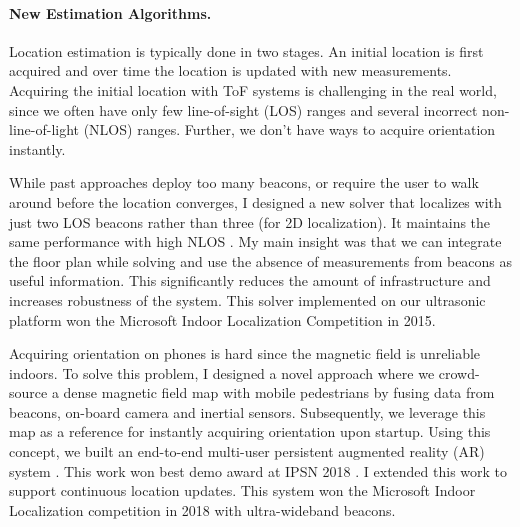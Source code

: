\documentclass[10pt]{article}
\begin{document}
\paragraph{New Estimation Algorithms. } 
Location estimation is typically done in two stages. An initial location is first acquired and over time the location is updated with new measurements. 
Acquiring the initial location with ToF systems is challenging in the real world, since we often have only few line-of-sight (LOS) ranges and several incorrect non-line-of-light (NLOS) ranges. Further, we don't have ways to acquire orientation instantly. 

While past approaches deploy too many beacons, or require the user to walk around before the location converges, I designed a new solver that localizes with just two LOS beacons rather than three (for 2D localization). It maintains the same performance with high NLOS \cite{rajagopal2018enhancing}.  %
My main insight was that we can integrate the floor plan while solving and use the absence of measurements from beacons as useful information. 
This significantly reduces the amount of infrastructure and increases robustness of the system. 
This solver implemented on our ultrasonic platform won the Microsoft Indoor Localization Competition in 2015. %

Acquiring orientation on phones is hard since the magnetic field is unreliable indoors. To solve this problem, 
I designed a novel approach %
where we %
crowd-source a dense magnetic field map with mobile pedestrians by fusing data from beacons, on-board camera and inertial sensors. 
Subsequently, we leverage this map as a reference for instantly acquiring orientation upon startup. %
Using this concept, we built an end-to-end multi-user persistent augmented reality (AR) system \cite{mobileAR}. This work won best demo award at IPSN 2018 \cite{rajagopal2018welcome}. I extended this work to support continuous location updates. This system won the Microsoft Indoor Localization competition in 2018 with ultra-wideband beacons. 
\end{document}
